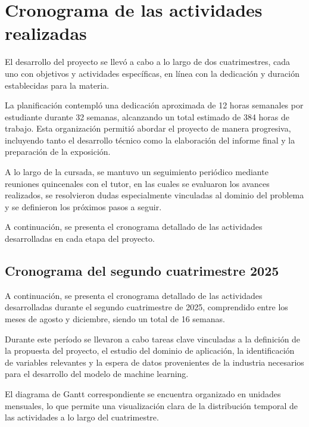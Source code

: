\documentclass[12pt,a4paper]{article}
\begin{document}
\newpage
\section{Cronograma de las actividades realizadas}

El desarrollo del proyecto se llevó a cabo a lo largo de dos cuatrimestres, cada uno con objetivos y actividades 
específicas, en línea con la dedicación y duración establecidas para la materia.

La planificación contempló una dedicación aproximada de 12 horas semanales por estudiante durante 32 semanas, 
alcanzando un total estimado de 384 horas de trabajo. Esta organización permitió abordar el proyecto de manera
progresiva, incluyendo tanto el desarrollo técnico como la elaboración del informe final y la preparación de la 
exposición.

A lo largo de la cursada, se mantuvo un seguimiento periódico mediante reuniones quincenales con el tutor, en las 
cuales se evaluaron los avances realizados, se resolvieron dudas especialmente vinculadas al dominio del problema
y se definieron los próximos pasos a seguir.

A continuación, se presenta el cronograma detallado de las actividades desarrolladas en cada etapa del proyecto.

\newpage
\subsection{Cronograma del segundo cuatrimestre 2025}

A continuación, se presenta el cronograma detallado de las actividades desarrolladas durante el segundo 
cuatrimestre de 2025, comprendido entre los meses de agosto y diciembre, siendo un total de 16 semanas.

Durante este período se llevaron a cabo tareas clave vinculadas a la definición de la propuesta del proyecto, 
el estudio del dominio de aplicación, la identificación de variables relevantes y la espera de datos 
provenientes de la industria necesarios para el desarrollo del modelo de machine learning.

El diagrama de Gantt correspondiente se encuentra organizado en unidades mensuales, lo que permite una 
visualización clara de la distribución temporal de las actividades a lo largo del cuatrimestre.
\end{document}

